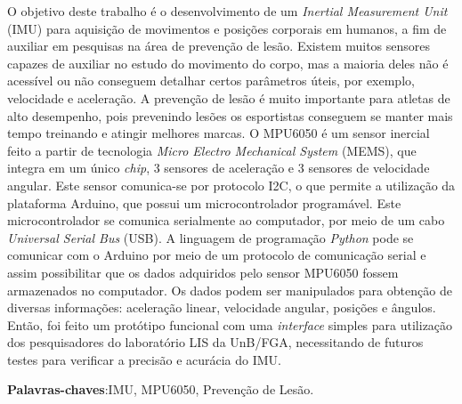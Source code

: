 \begin{resumo}
 
 \noindent
 O objetivo deste trabalho é o desenvolvimento de um \textit{Inertial Measurement Unit} (IMU) para aquisição de movimentos e posições corporais em humanos, a fim de auxiliar em pesquisas na área de prevenção de lesão. Existem muitos sensores capazes de auxiliar no estudo do movimento do corpo, mas a maioria deles não é acessível ou não conseguem detalhar certos parâmetros úteis, por exemplo, velocidade e aceleração. A prevenção de lesão é muito importante para atletas de alto desempenho, pois prevenindo lesões os esportistas conseguem se manter mais tempo treinando e atingir melhores marcas. O MPU6050 é um sensor inercial feito a partir de tecnologia \textit{Micro Electro Mechanical System} (MEMS), que integra em um único \textit{chip}, 3 sensores de aceleração e 3 sensores de velocidade angular. Este sensor comunica-se por protocolo I2C, o que permite a utilização da plataforma Arduino, que possui um microcontrolador programável. Este microcontrolador se comunica serialmente ao computador, por meio de um cabo \textit{Universal  Serial Bus} (USB). A linguagem de programação \textit{Python} pode se comunicar com o Arduino por meio de um protocolo de comunicação serial e assim possibilitar que os dados adquiridos pelo sensor MPU6050 fossem armazenados no computador. Os dados podem ser manipulados para obtenção de diversas informações: aceleração linear, velocidade angular, posições e ângulos. Então, foi feito um protótipo funcional com uma \textit{interface} simples para utilização dos pesquisadores do laboratório LIS da UnB/FGA, necessitando de futuros testes para verificar a precisão e acurácia do IMU. 
 
 \vspace{\onelineskip}
 \textbf{Palavras-chaves}:IMU, MPU6050, Prevenção de Lesão.
\end{resumo}
